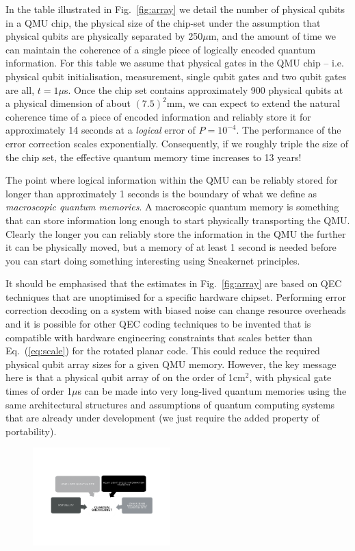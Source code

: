 \documentclass[twocolumn, aps, rmp, amsmath, amssymb, nofootinbib, superscriptaddress, longbibliography, floatfix, table-of-contents, eqsecnum]{revtex4-2}
\begin{document}
In the table illustrated in Fig.~\ref{fig:array} we detail the number of physical qubits in a QMU chip, the physical size of the chip-set under the assumption that physical qubits are physically separated by 250$\mu$m, and the amount of time we can maintain the coherence of a single piece of logically encoded quantum information. For this table we assume that physical gates in the QMU chip -- i.e. physical qubit initialisation, measurement, single qubit gates and two qubit gates are all, $t = 1\mu$s. Once the chip set contains approximately 900 physical qubits at a physical dimension of about $(7.5)^2$mm, we can expect to extend the natural coherence time of a piece of encoded information and reliably store it for approximately 14 seconds at a \textit{logical} error of $P= 10^{-4}$.  The performance of the error correction scales exponentially. Consequently, if we roughly triple the size of the chip set, the effective quantum memory time increases to 13 years!

The point where logical information within the QMU can be reliably stored for longer than approximately 1 seconds is the boundary of what we define as \textit{macroscopic quantum memories}. A macroscopic quantum memory is something that can store information long enough to start physically transporting the QMU. Clearly the longer you can reliably store the information in the QMU the further it can be physically moved, but a memory of at least 1 second is needed before you can start doing something interesting using Sneakernet principles.

It should be emphasised that the estimates in Fig.~\ref{fig:array} are based on QEC techniques that are unoptimised for a specific hardware chipset. Performing error correction decoding on a system with biased noise can change resource overheads and it is possible for other QEC coding techniques to be invented that is compatible with hardware engineering constraints that scales better than Eq.~(\ref{eq:scale}) for the rotated planar code. This could reduce the required physical qubit array sizes for a given QMU memory. However, the key message here is that a physical qubit array of on the order of 1cm$^2$, with physical gate times of order 1$\mu$s can be made into very long-lived quantum memories using the same architectural structures and assumptions of quantum computing systems that are already under development (we just require the added property of portability). 

\begin{figure}[htbp!]
	\includegraphics[clip=true, width=0.475\textwidth]{goal}
	\caption{} \label{fig:goal}
\end{figure}
\end{document}
